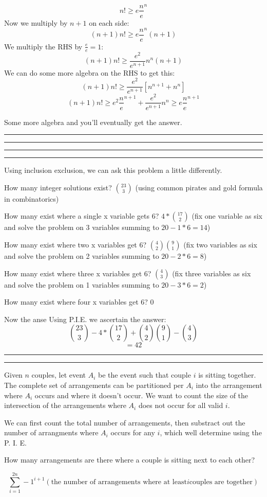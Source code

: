 \documentclass[11pt,letterpaper]{article}
\newcommand{\question}[2] {\vspace{.25in} \hrule\vspace{0.5em}
\noindent{\bf #1: #2} \vspace{0.5em}
\hrule \vspace{.10in}}
\begin{document}
$$n! \geq e \frac{n}{e}^n$$
Now we multiply by $n+1$ on each side:
$$(n+1)n! \geq e \frac{n}{e}^n (n+1)$$
We multiply the RHS by $\frac{e}{e} = 1$:
$$(n+1)n! \geq \frac{e^2}{e^{n+1}} n^{n} (n+1)$$
We can do some more algebra on the RHS to get this:
$$(n+1)n! \geq \frac{e^2}{e^{n+1}} [n^{n+1}+ n^{n}]$$
$$(n+1)n! \geq e^2 \frac{n}{e}^{n+1} + \frac{e^2}{e^{n+1}}  n^{n} \geq e \frac{n}{e}^{n+1}$$

Some more algebra and you'll eventually get the answer.



\question{5}{5}


\question{6}{6}
Using inclusion exclusion, we can ask this problem a little differently.

How many integer solutions exist? 
${ 23 \choose 3 }$ (using common pirates and gold formula in combinatorics)

How many exist where a single x variable gets 6?
$4 * { 17 \choose 2 }$ (fix one variable as six and solve the problem on 3 variables summing to $20-1*6 = 14$)

How many exist where two x variables get 6?
${ 4 \choose 2 } { 9 \choose 1 }$ (fix two variables as six and solve the problem on 2 variables summing to $20-2*6 = 8$)

How many exist where three x variables get 6?
${ 4 \choose 3 }$ (fix three variables as six and solve the problem on 1 variables summing to $20-3*6 = 2$)

How many exist where four x variables get 6?
0

Now the anse
Using P.I.E. we ascertain the answer:
$${ 23 \choose 3 } - 4 * { 17 \choose 2 } + { 4 \choose 2 } { 9 \choose 1 } - { 4 \choose 3 }$$
$$=42$$




\question{7}{7}
Given $n$ couples, let event $A_i$ be the event such that couple $i$ is sitting together.
The complete set of arrangements can be partitioned per $A_i$ into the arrangement where $A_i$ occurs
and where it doesn't occur. We want to count the size of the intersection of the arrangements
where $A_i$ does not occur for all valid $i$.

We can first count the total number of arrangements, then substract out the number of arrangments where $A_i$
occurs for any $i$, which well determine using the P. I. E.

How many arrangements are there where a couple is sitting next to each other?

$$\sum_{i=1}^{2n} -1^{i+1} (\text{the number of arrangements where at least} i \text{couples are together}) $$
\end{document}
